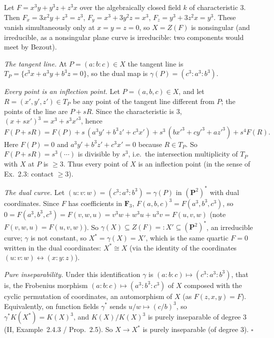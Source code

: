 \documentclass[11pt]{article}
\begin{document}
\pf
Let $F=x^3y+y^3z+z^3x$ over the algebraically closed field $k$ of characteristic $3$. Then $F_x=3x^2y+z^3=z^3$, $F_y=x^3+3y^2z=x^3$, $F_z=y^3+3z^2x=y^3$. These vanish simultaneously only at $x=y=z=0$, so $X=Z(F)$ is nonsingular (and irreducible, as a nonsingular plane curve is irreducible: two components would meet by Bezout).

\emph{The tangent line.} At $P=(a:b:c)\in X$ the tangent line is $T_P=\{c^3x+a^3y+b^3z=0\}$, so the dual map is $\gamma(P)=(c^3:a^3:b^3)$.

\emph{Every point is an inflection point.} Let $P=(a,b,c)\in X$, and let $R=(x',y',z')\in T_P$ be any point of the tangent line different from $P$; the points of the line are $P+sR$. Since the characteristic is $3$, $(x+sx')^3=x^3+s^3x'^3$, hence
\[
F(P+sR)=F(P)+s\,(a^3y'+b^3z'+c^3x')+s^3\,(bx'^3+cy'^3+az'^3)+s^4F(R).
\]
Here $F(P)=0$ and $a^3y'+b^3z'+c^3x'=0$ because $R\in T_P$. So $F(P+sR)=s^3(\cdots)$ is divisible by $s^3$, i.e.\ the intersection multiplicity of $T_P$ with $X$ at $P$ is $\ge3$. Thus every point of $X$ is an inflection point (in the sense of Ex.~2.3: contact $\ge3$).

\emph{The dual curve.} Let $(u:v:w)=(c^3:a^3:b^3)=\gamma(P)$ in $(\mathbf P^2)^*$ with dual coordinates. Since $F$ has coefficients in $\mathbf F_3$, $F(a,b,c)^3=F(a^3,b^3,c^3)$, so $0=F(a^3,b^3,c^3)=F(v,w,u)=v^3w+w^3u+u^3v=F(u,v,w)$ (note $F(v,w,u)=F(u,v,w)$). So $\gamma(X)\subseteq Z(F)=:X'\subseteq(\mathbf P^2)^*$, an irreducible curve; $\gamma$ is not constant, so $X^*=\gamma(X)=X'$, which is the same quartic $F=0$ written in the dual coordinates: $X^*\cong X$ (via the identity of the coordinates $(u:v:w)\leftrightarrow(x:y:z)$).

\emph{Pure inseparability.} Under this identification $\gamma$ is $(a:b:c)\mapsto(c^3:a^3:b^3)$, that is, the Frobenius morphism $(a:b:c)\mapsto(a^3:b^3:c^3)$ of $X$ composed with the cyclic permutation of coordinates, an automorphism of $X$ (as $F(z,x,y)=F$). Equivalently, on function fields $\gamma^*$ sends $u/w\mapsto(c/b)^3$, so $\gamma^*K(X^*)=K(X)^3$, and $K(X)/K(X)^3$ is purely inseparable of degree $3$ (II, Example~2.4.3 / Prop.~2.5). So $X\to X^*$ is purely inseparable (of degree $3$). \hfill$\square$
\end{document}
